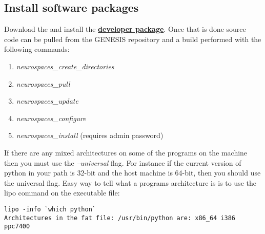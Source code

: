 \documentclass[12pt]{article}
\begin{document}
\subsection*{Install software packages}


Download the and install the \href{../../developer-package/developer-package.tex}{\bf developer package}. Once that is done source code can be pulled from the GENESIS repository and a build performed with the following commands:
\begin{enumerate}
   \item{\it neurospaces\_create\_directories}
   \item{\it neurospaces\_pull}
   \item{\it neurospaces\_update}
   \item{\it neurospaces\_configure}
   \item{\it neurospaces\_install} (requires admin password) 
\end{enumerate}

If there are any mixed architectures on some of the programs on the machine then you must use the {\it --universal} flag. For instance if the current version of python in your path is 32-bit and the host machine is 64-bit, then you should use the universal flag. Easy way to tell what a programs architecture is is to use the lipo command on the executable file:

\begin{verbatim}
lipo -info `which python`
Architectures in the fat file: /usr/bin/python are: x86_64 i386 ppc7400
\end{verbatim}
\end{document}
